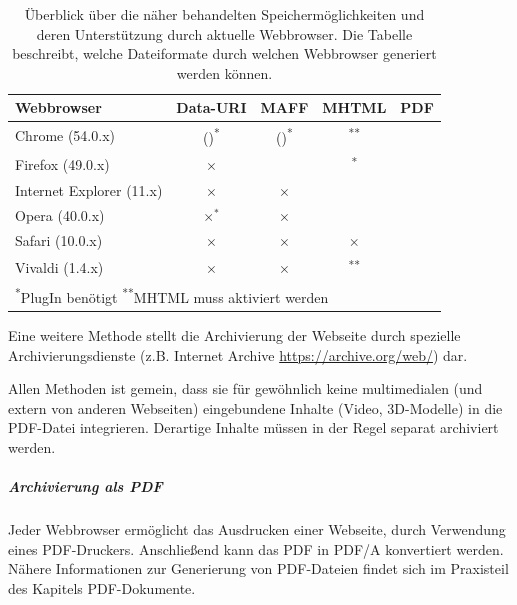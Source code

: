 \begin{table}[hbt]
\centering
\footnotesize
\begin{tabular}{lcccc}
	\toprule
	Webbrowser	& Data-URI & MAFF & MHTML & PDF \\
	\midrule
	Chrome (54.0.x) & (\checkmark)\textsuperscript{*} & (\checkmark)\textsuperscript{*} & \checkmark\textsuperscript{**} & \checkmark \\
	Firefox (49.0.x) & \boldmath$\times$ & \checkmark & \checkmark\textsuperscript{*} & \checkmark \\
	Internet Explorer (11.x) & \boldmath$\times$ & \boldmath$\times$ & \checkmark & \checkmark \\
	Opera (40.0.x) & \boldmath$\times^*$ & \boldmath$\times$ & \checkmark & \checkmark \\
	Safari (10.0.x) & \boldmath$\times$ & \boldmath$\times$ & \boldmath$\times$ & \checkmark \\
	Vivaldi (1.4.x) & \boldmath$\times$ & \boldmath$\times$ & \checkmark\textsuperscript{**} & \checkmark \\
	\midrule
	\multicolumn{5}{l}{ \textsuperscript{*}PlugIn benötigt \textsuperscript{**}MHTML muss aktiviert werden}\\

	\bottomrule 
\end{tabular}
\caption{Überblick über die näher behandelten Speichermöglichkeiten und deren Unterstützung durch aktuelle Webbrowser. Die Tabelle beschreibt, welche Dateiformate durch welchen Webbrowser generiert werden können.}
\label{tab:webseiteSpeichern}
\end{table}


Eine weitere Methode stellt die Archivierung der Webseite durch spezielle Archivierungsdienste (z.B. Internet Archive \url{https://archive.org/web/}) dar. 

Allen Methoden ist gemein, dass sie für gewöhnlich keine multimedialen (und extern von anderen Webseiten) eingebundene Inhalte (Video, 3D-Modelle) in die PDF-Datei integrieren. Derartige Inhalte müssen in der Regel separat archiviert werden. 


\subparagraph{Archivierung als PDF}

Jeder Webbrowser ermöglicht das Ausdrucken einer Webseite, durch Verwendung eines PDF-Druckers. Anschließend  kann das PDF in PDF/A konvertiert werden. Nähere Informationen zur Generierung von PDF-Dateien findet sich im Praxisteil des Kapitels PDF-Dokumente.

